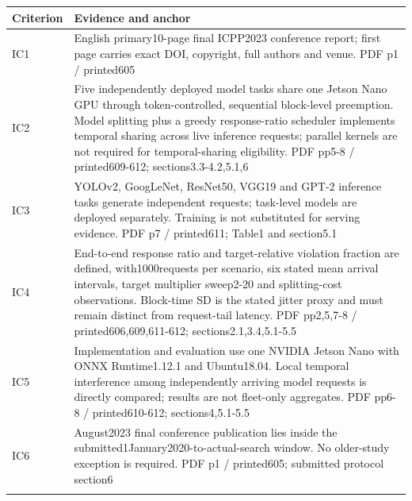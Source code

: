 \begin{longtable}{>{\raggedright\arraybackslash}p{}>{\raggedright\arraybackslash}p{}}
\toprule
\textbf{Criterion} & \textbf{Evidence and anchor}\\\midrule\endhead
IC1 & English primary10-page final ICPP2023 conference report;\allowbreak{} first page carries exact DOI,\allowbreak{} copyright,\allowbreak{} full authors and venue. PDF p1 / printed605\\\addlinespace
IC2 & Five independently deployed model tasks share one Jetson Nano GPU through token-controlled,\allowbreak{} sequential block-level preemption. Model splitting plus a greedy response-ratio scheduler implements temporal sharing across live inference requests;\allowbreak{} parallel kernels are not required for temporal-sharing eligibility. PDF pp5-8 / printed609-612;\allowbreak{} sections3.3-4.2,\allowbreak{}5.1,\allowbreak{}6\\\addlinespace
IC3 & YOLOv2,\allowbreak{} GoogLeNet,\allowbreak{} ResNet50,\allowbreak{} VGG19 and GPT-2 inference tasks generate independent requests;\allowbreak{} task-level models are deployed separately. Training is not substituted for serving evidence. PDF p7 / printed611;\allowbreak{} Table1 and section5.1\\\addlinespace
IC4 & End-to-end response ratio and target-relative violation fraction are defined,\allowbreak{} with1000requests per scenario,\allowbreak{} six stated mean arrival intervals,\allowbreak{} target multiplier sweep2-20 and splitting-cost observations. Block-time SD is the stated jitter proxy and must remain distinct from request-tail latency. PDF pp2,\allowbreak{}5,\allowbreak{}7-8 / printed606,\allowbreak{}609,\allowbreak{}611-612;\allowbreak{} sections2.1,\allowbreak{}3.4,\allowbreak{}5.1-5.5\\\addlinespace
IC5 & Implementation and evaluation use one NVIDIA Jetson Nano with ONNX Runtime1.12.1 and Ubuntu18.04. Local temporal interference among independently arriving model requests is directly compared;\allowbreak{} results are not fleet-only aggregates. PDF pp6-8 / printed610-612;\allowbreak{} sections4,\allowbreak{}5.1-5.5\\\addlinespace
IC6 & August2023 final conference publication lies inside the submitted1January2020-to-actual-search window. No older-study exception is required. PDF p1 / printed605;\allowbreak{} submitted protocol section6\\\addlinespace
\bottomrule\end{longtable}
